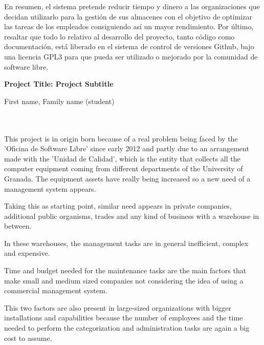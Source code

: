En resumen, el sistema pretende reducir tiempo y dinero a las organizaciones que decidan utilizarlo para la gestión de sus almacenes con el objetivo  de optimizar las tareas de los empleados consiguiendo así un mayor rendimiento. 
Por último, resaltar que todo lo relativo al desarrollo del proyecto, tanto código como documentación, está liberado en el sistema de control de versiones Github, bajo una licencia GPL3 para que pueda ser utilizado o mejorado por la comunidad de software libre.


\cleardoublepage


\thispagestyle{empty}


\begin{center}
{\large\bfseries Project Title: Project Subtitle}\\
\end{center}
\begin{center}
First name, Family name (student)\\
\end{center}

\\

\vspace{0.7cm}
\\

This project is in origin born because of a real problem being faced by the 'Oficina de Software Libre' since early 2012 and partly due to an arrangement made with the 'Unidad de Calidad', which is the entity that collects all the computer equipment coming from different departments of the University of Granada. The equipment assets have really being increased so a new need of a management system appears.

Taking this as starting point, similar need appears in private companies, additional public organisms, trades and any kind of business with a warehouse in between.


In these warehouses, the management tasks are in general inefficient, complex and expensive.

Time and budget needed for the maintenance tasks are the main factors that make small and medium sized companies not considering the idea of using a commercial management system.


This two factors are also present in large-sized organizations with bigger installations and capabilities because the number of employees and the time needed to perform the categorization and administration tasks are again a big cost to assume.


